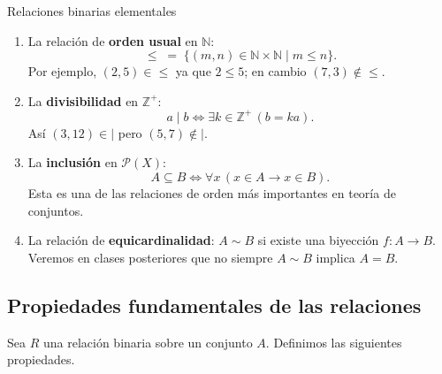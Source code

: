 \begin{ejemplo}{Relaciones binarias elementales}{}
\begin{enumerate}[leftmargin=2em, label=(\alph*)]
  \item La relación de \textbf{orden usual} en $\mathbb{N}$:
  \[
    {\leq} \;=\; \{(m,n) \in \mathbb{N}\times\mathbb{N} \mid m \leq n\}.
  \]
  Por ejemplo, $(2,5) \in {\leq}$ ya que $2 \leq 5$; en cambio $(7,3) \notin {\leq}$.

  \item La \textbf{divisibilidad} en $\mathbb{Z}^+$:
  \[
    a \mid b \iff \exists k \in \mathbb{Z}^+\,(b = ka).
  \]
  Así $(3,12) \in {\mid}$ pero $(5,7) \notin {\mid}$.

  \item La \textbf{inclusión} en $\mathcal{P}(X)$:
  \[
    A \subseteq B \iff \forall x\,(x \in A \to x \in B).
  \]
  Esta es una de las relaciones de orden más importantes en teoría de conjuntos.

  \item La relación de \textbf{equicardinalidad}: $A \sim B$ si existe una biyección $f: A \to B$. Veremos en clases posteriores que no siempre $A \sim B$ implica $A = B$.
\end{enumerate}
\end{ejemplo}

\subsection{Propiedades fundamentales de las relaciones}

Sea $R$ una relación binaria sobre un conjunto $A$. Definimos las siguientes propiedades.

